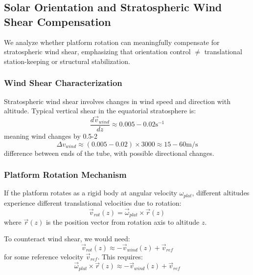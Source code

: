 {{{{\subsection{Solar Orientation and Stratospheric Wind Shear Compensation}
We analyze whether platform rotation can meaningfully compensate for stratospheric wind shear, emphasizing that orientation control $\neq$ translational station-keeping or structural stabilization.

\subsubsection{Wind Shear Characterization}
Stratospheric wind shear involves changes in wind speed and direction with altitude. Typical vertical shear in the equatorial stratosphere is:
\begin{equation}
\frac{d\vec{v}_{wind}}{dz} \approx 0.005-0.02  \text{s}^{-1}
\end{equation}
meaning wind changes by 0.5-2%
\begin{equation}
\Delta v_{wind} \approx (0.005-0.02) \times 3000 \approx 15-60  \text{m/s}
\end{equation}
difference between ends of the tube, with possible directional changes.

\subsubsection{Platform Rotation Mechanism}
If the platform rotates as a rigid body at angular velocity $\omega_{plat}$, different altitudes experience different translational velocities due to rotation:
\begin{equation}
\vec{v}_{rot}(z) = \vec{\omega}_{plat} \times \vec{r}(z)
\end{equation}
where $\vec{r}(z)$ is the position vector from rotation axis to altitude $z$.

To counteract wind shear, we would need:
\begin{equation}
\vec{v}_{rot}(z) \approx -\vec{v}_{wind}(z) + \vec{v}_{ref}
\end{equation}
for some reference velocity $\vec{v}_{ref}$. This requires:
\begin{equation}
\vec{\omega}_{plat} \times \vec{r}(z) \approx -\vec{v}_{wind}(z) + \vec{v}_{ref}
\end{equation}

}}}}
